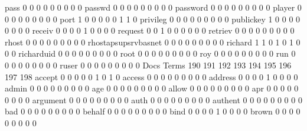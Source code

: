 \documentclass[compress,8pt]{beamer}
\begin{document}
\begin{frame}
\begin{Schunk}
  pass                                       0   0   0   0   0   0   0   0   0
  passwd                                     0   0   0   0   0   0   0   0   0
  password                                   0   0   0   0   0   0   0   0   0
  player                                     0   0   0   0   0   0   0   0   0
  port                                       1   0   0   0   0   0   1   1   0
  privileg                                   0   0   0   0   0   0   0   0   0
  publickey                                  1   0   0   0   0   0   0   0   0
  receiv                                     0   0   0   0   1   0   0   0   0
  request                                    0   0   1   0   0   0   0   0   0
  retriev                                    0   0   0   0   0   0   0   0   0
  rhost                                      0   0   0   0   0   0   0   0   0
  rhostapsupsrvbasnet                        0   0   0   0   0   0   0   0   0
  richard                                    1   1   0   1   0   1   0   0   0
  richarduid                                 0   0   0   0   0   0   0   0   0
  root                                       0   0   0   0   0   0   0   0   0
  roy                                        0   0   0   0   0   0   0   0   0
  run                                        0   0   0   0   0   0   0   0   0
  ruser                                      0   0   0   0   0   0   0   0   0
                                          Docs
Terms                                      190 191 192 193 194 195 196 197 198
  accept                                     0   0   0   0   0   1   0   1   0
  access                                     0   0   0   0   0   0   0   0   0
  address                                    0   0   0   0   1   0   0   0   0
  admin                                      0   0   0   0   0   0   0   0   0
  age                                        0   0   0   0   0   0   0   0   0
  allow                                      0   0   0   0   0   0   0   0   0
  apr                                        0   0   0   0   0   0   0   0   0
  argument                                   0   0   0   0   0   0   0   0   0
  auth                                       0   0   0   0   0   0   0   0   0
  authent                                    0   0   0   0   0   0   0   0   0
  bad                                        0   0   0   0   0   0   0   0   0
  behalf                                     0   0   0   0   0   0   0   0   0
  bind                                       0   0   0   0   1   0   0   0   0
  brown                                      0   0   0   0   0   0   0   0   0

\end{Schunk}
\end{frame}
\end{document}
